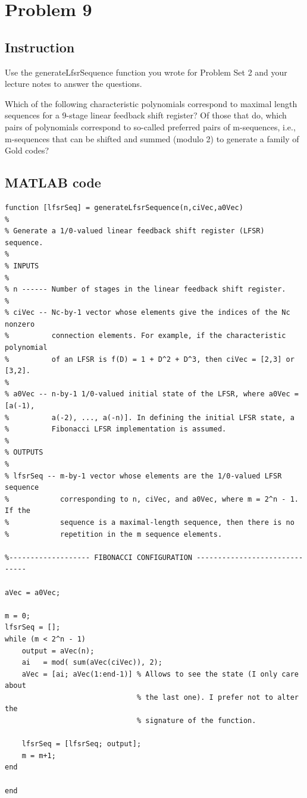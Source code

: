 \section{Problem 9}

\subsection{Instruction}

Use the generateLfsrSequence function you wrote for Problem Set 2 and your
lecture notes to answer the questions.

Which of the following characteristic polynomials correspond to maximal length
sequences for a 9-stage linear feedback shift register? Of those that do, which
pairs of polynomials correspond to so-called preferred pairs of m-sequences,
i.e., m-sequences that can be shifted and summed (modulo 2) to generate a
family of Gold codes?

\subsection{MATLAB code}

\begin{lstlisting}
function [lfsrSeq] = generateLfsrSequence(n,ciVec,a0Vec)
%
% Generate a 1/0-valued linear feedback shift register (LFSR) sequence.
%
% INPUTS
%
% n ------ Number of stages in the linear feedback shift register.
%
% ciVec -- Nc-by-1 vector whose elements give the indices of the Nc nonzero
%          connection elements. For example, if the characteristic polynomial
%          of an LFSR is f(D) = 1 + D^2 + D^3, then ciVec = [2,3] or [3,2].
%
% a0Vec -- n-by-1 1/0-valued initial state of the LFSR, where a0Vec = [a(-1),
%          a(-2), ..., a(-n)]. In defining the initial LFSR state, a
%          Fibonacci LFSR implementation is assumed.
%
% OUTPUTS
%
% lfsrSeq -- m-by-1 vector whose elements are the 1/0-valued LFSR sequence
%            corresponding to n, ciVec, and a0Vec, where m = 2^n - 1. If the
%            sequence is a maximal-length sequence, then there is no
%            repetition in the m sequence elements.

%------------------- FIBONACCI CONFIGURATION ------------------------------

aVec = a0Vec;

m = 0;
lfsrSeq = [];
while (m < 2^n - 1)
    output = aVec(n);
    ai   = mod( sum(aVec(ciVec)), 2);
    aVec = [ai; aVec(1:end-1)] % Allows to see the state (I only care about 
                               % the last one). I prefer not to alter the 
                               % signature of the function.

    lfsrSeq = [lfsrSeq; output];
    m = m+1;
end

end
\end{lstlisting}

